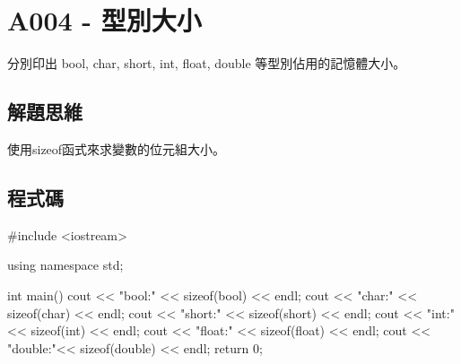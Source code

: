 \section{A004 - 型別大小}
分別印出 bool, char, short, int, float, double 等型別佔用的記憶體大小。

\subsection{解題思維}

使用sizeof函式來求變數的位元組大小。 
	
\subsection{程式碼}
\begin{cppcode}
	#include <iostream>
	
	using namespace std;
	
	int main()
	{
		cout << "bool:" << sizeof(bool) << endl;
		cout << "char:" << sizeof(char) << endl;
		cout << "short:" << sizeof(short) << endl;
		cout << "int:" << sizeof(int) << endl;
		cout << "float:" << sizeof(float) << endl;
		cout << "double:"<< sizeof(double) << endl;
		return 0;
	}
\end{cppcode}
